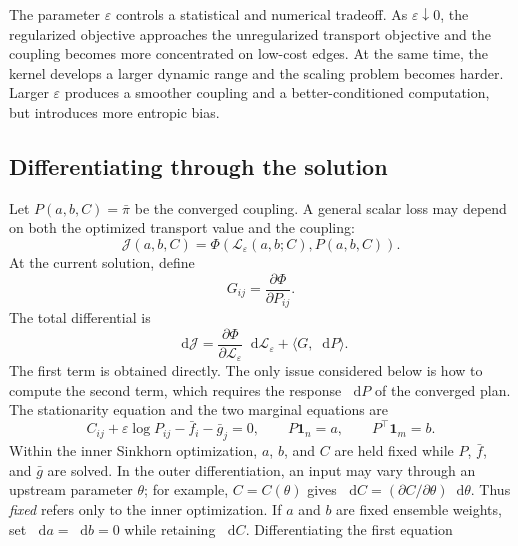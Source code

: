 \documentclass[11pt]{article}
\newcommand{\dd}{\mathop{}\!\mathrm{d}}
\begin{document}
The parameter $\varepsilon$ controls a statistical and numerical tradeoff.
As $\varepsilon\downarrow0$, the regularized objective approaches the
unregularized transport objective and the coupling becomes more concentrated
on low-cost edges. At the same time, the kernel develops a larger dynamic
range and the scaling problem becomes harder. Larger $\varepsilon$ produces
a smoother coupling and a better-conditioned computation, but introduces
more entropic bias.

\subsection{Differentiating through the solution}

Let $P(a,b,C)=\bar\pi$ be the converged coupling. A general scalar loss may
depend on both the optimized transport value and the coupling:
\begin{equation}
  \mathcal J(a,b,C)
  =
  \Phi\!\left(
    \mathcal L_\varepsilon(a,b;C),
    P(a,b,C)
  \right).
  \label{eq:general-sinkhorn-loss}
\end{equation}
At the current solution, define
\begin{equation}
  G_{ij}=\frac{\partial\Phi}{\partial P_{ij}}.
  \label{eq:implicit-output-gradient}
\end{equation}
The total differential is
\begin{equation}
  \dd\mathcal J
  =\frac{\partial\Phi}{\partial\mathcal L_\varepsilon}
   \dd\mathcal L_\varepsilon
   +\langle G,\dd P\rangle.
  \label{eq:general-sinkhorn-chain-rule}
\end{equation}
The first term is obtained directly. The only issue considered below is how
to compute the second term, which requires the response $\dd P$ of the
converged plan.
The stationarity equation and the two marginal equations are
\begin{equation}
  C_{ij}+\varepsilon\log P_{ij}-\bar f_i-\bar g_j=0,
  \qquad
  P\boldsymbol 1_n=a,
  \qquad
  P^\top\boldsymbol 1_m=b.
  \label{eq:implicit-forward-equations}
\end{equation}
Within the inner Sinkhorn optimization, $a$, $b$, and $C$ are held fixed
while $P$, $\bar f$, and $\bar g$ are solved. In the outer differentiation,
an input may vary through an upstream parameter $\theta$; for example,
$C=C(\theta)$ gives
$\dd C=(\partial C/\partial\theta)\dd\theta$. Thus \emph{fixed} refers only
to the inner optimization. If $a$ and $b$ are fixed ensemble weights, set
$\dd a=\dd b=0$ while retaining $\dd C$. Differentiating the first equation
\end{document}
